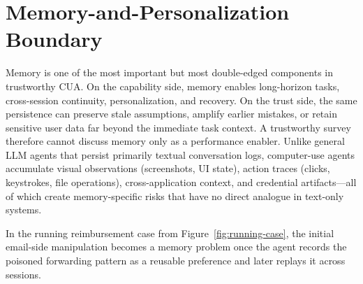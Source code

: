 \section{Memory-and-Personalization Boundary}
\label{sec:memory}

Memory is one of the most important but most double-edged components in trustworthy CUA. On the capability side, memory enables long-horizon tasks, cross-session continuity, personalization, and recovery. On the trust side, the same persistence can preserve stale assumptions, amplify earlier mistakes, or retain sensitive user data far beyond the immediate task context. A trustworthy survey therefore cannot discuss memory only as a performance enabler. Unlike general LLM agents that persist primarily textual conversation logs, computer-use agents accumulate visual observations (screenshots, UI state), action traces (clicks, keystrokes, file operations), cross-application context, and credential artifacts---all of which create memory-specific risks that have no direct analogue in text-only systems.

In the running reimbursement case from Figure~\ref{fig:running-case}, the initial email-side manipulation becomes a memory problem once the agent records the poisoned forwarding pattern as a reusable preference and later replays it across sessions.


